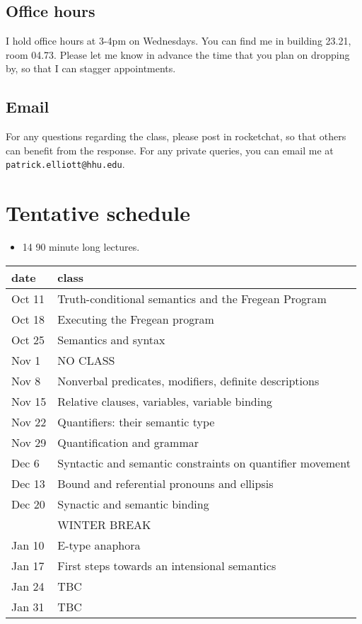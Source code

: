 \documentclass[letterpaper,parskip=half]{scrartcl}
\begin{document}
\subsection{Office hours}
\label{sec:org8af9629}

I hold office hours at 3-4pm on Wednesdays. You can find me in building 23.21, room 04.73. Please let me know in advance the time that you plan on dropping by, so that I can stagger appointments.
\subsection{Email}
\label{sec:org56d8b04}

For any questions regarding the class, please post in rocketchat, so that others can benefit from the response. For any private queries, you can email me at \texttt{patrick.elliott@hhu.edu}.
\section{Tentative schedule}
\label{sec:org74d2a96}

\begin{itemize}
\item 14 90 minute long lectures.
\end{itemize}

\begin{center}
\begin{tabular}{ll}
date & class\\[0pt]
\hline
Oct 11 & Truth-conditional semantics and the Fregean Program\\[0pt]
Oct 18 & Executing the Fregean program\\[0pt]
Oct 25 & Semantics and syntax\\[0pt]
Nov 1 & NO CLASS\\[0pt]
Nov 8 & Nonverbal predicates, modifiers, definite descriptions\\[0pt]
Nov 15 & Relative clauses, variables, variable binding\\[0pt]
Nov 22 & Quantifiers: their semantic type\\[0pt]
Nov 29 & Quantification and grammar\\[0pt]
Dec 6 & Syntactic and semantic constraints on quantifier movement\\[0pt]
Dec 13 & Bound and referential pronouns and ellipsis\\[0pt]
Dec 20 & Synactic and semantic binding\\[0pt]
 & WINTER BREAK\\[0pt]
Jan 10 & E-type anaphora\\[0pt]
Jan 17 & First steps towards an intensional semantics\\[0pt]
Jan 24 & TBC\\[0pt]
Jan 31 & TBC\\[0pt]
\end{tabular}
\end{center}

\printbibliography
\end{document}
